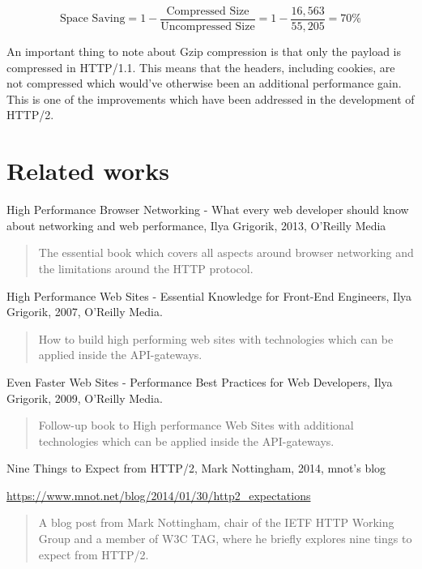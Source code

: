 \documentclass{cslthse-msc}
\begin{document}
\begin{equation}
\mbox{Space Saving} = 1 - \frac{\mbox{Compressed Size}}{\mbox{Uncompressed Size}} = 1 - \frac{16,563}{55,205} = 70\%
\end{equation}

An important thing to note about Gzip compression is that only the payload is compressed in HTTP/1.1\cite{header_compression}. This means that the headers, including cookies, are not compressed which would've otherwise been an additional performance gain. This is one of the improvements which have been addressed in the development of HTTP/2\cite[page 222]{HPBN}.

\section{Related works}
High Performance Browser Networking - What every web developer should know about networking and web performance, Ilya Grigorik, 2013, O'Reilly Media

\begin{quote}
	The essential book which covers all aspects around browser networking and the limitations around the HTTP protocol.
\end{quote}

\vspace{5mm}
\noindent High Performance Web Sites - Essential Knowledge for Front-End Engineers, Ilya Grigorik, 2007, O'Reilly Media.

\begin{quote}
	How to build high performing web sites with technologies which can be applied inside the API-gateways.
\end{quote}

\vspace{5mm}
\noindent Even Faster Web Sites - Performance Best Practices for Web Developers, Ilya Grigorik, 2009, O'Reilly Media.

\begin{quote}
	Follow-up book to High performance Web Sites with additional technologies which can be applied inside the API-gateways.
\end{quote}

\vspace{5mm}
\noindent Nine Things to Expect from HTTP/2, Mark Nottingham, 2014, mnot's blog

\noindent \url{https://www.mnot.net/blog/2014/01/30/http2_expectations}

\begin{quote}
	A blog post from Mark Nottingham, chair of the IETF HTTP Working Group and a member of W3C TAG, where he briefly explores nine tings to expect from HTTP/2.
\end{quote}
\end{document}

